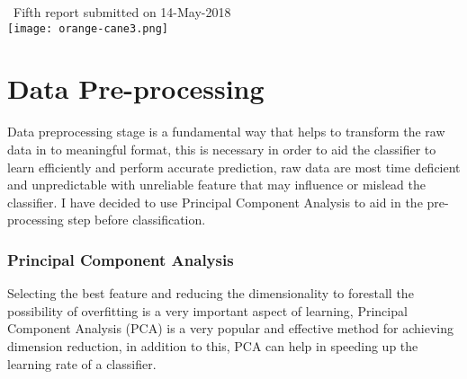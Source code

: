 \documentclass[a4paper, parskip=full]{scrartcl}
\begin{document}
\begin{titlepage}
	
	
	{\large \ Fifth report submitted on 14-May-2018}\\[0.2cm] %
	
	
	\texttt{[image: orange-cane3.png]}\\[0.2cm] %
	
	
	\vfill %
	
\end{titlepage}







 \section*{Data Pre-processing}
 
Data preprocessing stage is a fundamental way that helps to transform the raw data in to meaningful format, this is necessary in order to aid the classifier to learn efficiently and perform accurate prediction, raw data are most time deficient and unpredictable with unreliable feature that may influence or mislead the classifier. I have decided to use Principal Component Analysis to aid in the pre-processing step before classification.

\subsubsection*{Principal Component Analysis}

Selecting the best feature and reducing the dimensionality to forestall the possibility of overfitting is a very important aspect of learning, Principal Component Analysis (PCA) is a very popular and effective method for achieving dimension reduction, in addition to this, PCA can help in speeding up the learning rate of a classifier. 
\end{document}
